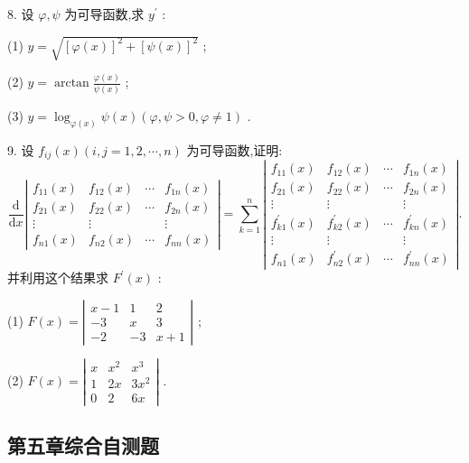 8. 设 \(\varphi ,\psi\) 为可导函数,求 \({y}^{\prime }\) :

(1) \(y = \sqrt{{\left\lbrack  \varphi \left( x\right) \right\rbrack  }^{2} + {\left\lbrack  \psi \left( x\right) \right\rbrack  }^{2}}\) ;

(2) \(y = \arctan \frac{\varphi \left( x\right) }{\psi \left( x\right) }\) ;

(3) \(y = {\log }_{\varphi \left( x\right) }\psi \left( x\right) \left( {\varphi ,\psi  > 0,\varphi  \neq  1}\right)\) .

9. 设 \({f}_{ij}\left( x\right) \left( {i,j = 1,2,\cdots ,n}\right)\) 为可导函数,证明:
\[
\frac{\mathrm{d}}{\mathrm{d}x}\left| \begin{matrix} {f}_{11}\left( x\right) & {f}_{12}\left( x\right) & \cdots & {f}_{1n}\left( x\right) \\  {f}_{21}\left( x\right) & {f}_{22}\left( x\right) & \cdots & {f}_{2n}\left( x\right) \\  \vdots & \vdots & & \vdots \\  {f}_{n1}\left( x\right) & {f}_{n2}\left( x\right) & \cdots & {f}_{nn}\left( x\right)  \end{matrix}\right|  = \mathop{\sum }\limits_{{k = 1}}^{n}\left| \begin{matrix} {f}_{11}\left( x\right) & {f}_{12}\left( x\right) & \cdots & {f}_{1n}\left( x\right) \\  {f}_{21}\left( x\right) & {f}_{22}\left( x\right) & \cdots & {f}_{2n}\left( x\right) \\  \vdots & \vdots & & \vdots \\  {f}_{k1}^{\prime }\left( x\right) & {f}_{k2}^{\prime }\left( x\right) & \cdots & {f}_{kn}^{\prime }\left( x\right) \\  \vdots & \vdots & & \vdots \\  {f}_{n1}\left( x\right) & {f}_{n2}^{\prime }\left( x\right) & \cdots & {f}_{nn}^{\prime }\left( x\right)  \end{matrix}\right| .
\]
并利用这个结果求 \({F}^{\prime }\left( x\right)\) :

(1) \(F\left( x\right)  = \left| \begin{matrix} x - 1 & 1 & 2 \\   - 3 & x & 3 \\   - 2 &  - 3 & x + 1 \end{matrix}\right|\) ;

(2) \(F\left( x\right)  = \left| \begin{matrix} x & {x}^{2} & {x}^{3} \\  1 & {2x} & 3{x}^{2} \\  0 & 2 & {6x} \end{matrix}\right|\) .

\subsection{第五章综合自测题}

